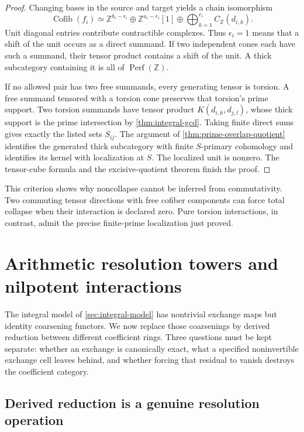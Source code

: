 \documentclass[11pt]{article}
\theoremstyle{definition}
\theoremstyle{remark}
\newcommand{\Cofib}{\operatorname{Cofib}}
\begin{document}
\begin{proof}
Changing bases in the source and target yields a chain isomorphism
\[
 \Cofib(f_i)\simeq
 \mathbb Z^{b_i-r_i}\oplus\mathbb Z^{a_i-r_i}[1]
 \oplus\bigoplus_{k=1}^{r_i}C_{\mathbb Z}(d_{i,k}).
\]
Unit diagonal entries contribute contractible complexes. Thus $\epsilon_i=1$ means that a shift of the unit occurs as a direct summand. If two independent cones each have such a summand, their tensor product contains a shift of the unit. A thick subcategory containing it is all of $\operatorname{Perf}(\mathbb Z)$.

If no allowed pair has two free summands, every generating tensor is torsion. A free summand tensored with a torsion cone preserves that torsion's prime support. Two torsion summands have tensor product $K(d_{i,k},d_{j,l})$, whose thick support is the prime intersection by \cref{thm:integral-gcd}. Taking finite direct sums gives exactly the listed sets $S_{ij}$. The argument of \cref{thm:prime-overlap-quotient} identifies the generated thick subcategory with finite $S$-primary cohomology and identifies its kernel with localization at $S$. The localized unit is nonzero. The tensor-cube formula and the excisive-quotient theorem finish the proof.
\end{proof}

This criterion shows why noncollapse cannot be inferred from commutativity. Two commuting tensor directions with free cofiber components can force total collapse when their interaction is declared zero. Pure torsion interactions, in contrast, admit the precise finite-prime localization just proved.


\section{Arithmetic resolution towers and nilpotent interactions}\label{sec:arithmetic-towers}

The integral model of \cref{sec:integral-model} has nontrivial exchange maps but identity coarsening functors. We now replace those coarsenings by derived reduction between different coefficient rings. Three questions must be kept separate: whether an exchange is canonically exact, what a specified noninvertible exchange cell leaves behind, and whether forcing that residual to vanish destroys the coefficient category.

\subsection{Derived reduction is a genuine resolution operation}
\end{document}
